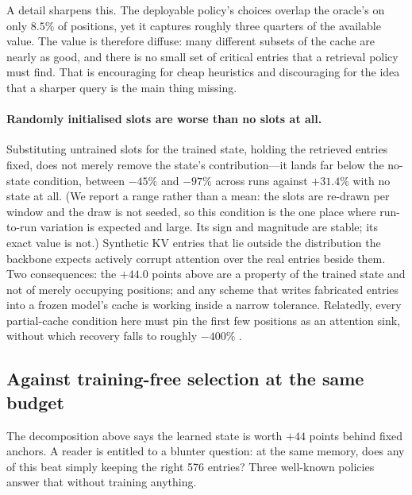 \documentclass[11pt]{article}
\begin{document}
A detail sharpens this. The deployable policy's choices overlap the oracle's on
only $8.5\%$ of positions, yet it captures roughly three quarters of the
available value. The value is therefore diffuse: many different subsets of the
cache are nearly as good, and there is no small set of critical entries that a
retrieval policy must find. That is encouraging for cheap heuristics and
discouraging for the idea that a sharper query is the main thing missing.

\paragraph{Randomly initialised slots are worse than no slots at all.}
Substituting untrained slots for the trained state, holding the retrieved entries
fixed, does not merely remove the state's contribution---it lands far below the
no-state condition, between $-45\%$ and $-97\%$ across runs against $+31.4\%$ with
no state at all. (We report a range rather than a mean: the slots are re-drawn
per window and the draw is not seeded, so this condition is the one place where
run-to-run variation is expected and large. Its sign and magnitude are stable;
its exact value is not.) Synthetic
KV entries that lie outside the distribution the backbone expects actively
corrupt attention over the real entries beside them. Two consequences: the
$+44.0$ points above are a property of the trained state and not of merely
occupying positions; and any scheme that writes fabricated entries into a frozen
model's cache is working inside a narrow tolerance. Relatedly, every partial-cache
condition here must pin the first few positions as an attention sink, without
which recovery falls to roughly $-400\%$ \citep{streamingllm}.

\subsection{Against training-free selection at the same budget}
\label{sec:baselines}

The decomposition above says the learned state is worth $+44$ points behind
fixed anchors. A reader is entitled to a blunter question: at the same memory,
does any of this beat simply keeping the right 576 entries? Three well-known
policies answer that without training anything.
\end{document}
